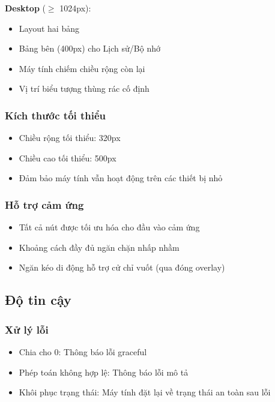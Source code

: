 \textbf{Desktop} ($\geq$ 1024px):
\begin{itemize}
    \item Layout hai bảng
    \item Bảng bên (400px) cho Lịch sử/Bộ nhớ
    \item Máy tính chiếm chiều rộng còn lại
    \item Vị trí biểu tượng thùng rác cố định
\end{itemize}

\subsubsection{Kích thước tối thiểu}
\begin{itemize}
    \item Chiều rộng tối thiểu: 320px
    \item Chiều cao tối thiểu: 500px
    \item Đảm bảo máy tính vẫn hoạt động trên các thiết bị nhỏ
\end{itemize}

\subsubsection{Hỗ trợ cảm ứng}
\begin{itemize}
    \item Tất cả nút được tối ưu hóa cho đầu vào cảm ứng
    \item Khoảng cách đầy đủ ngăn chặn nhấp nhầm
    \item Ngăn kéo di động hỗ trợ cử chỉ vuốt (qua đóng overlay)
\end{itemize}

\subsection{Độ tin cậy}

\subsubsection{Xử lý lỗi}
\begin{itemize}
    \item Chia cho 0: Thông báo lỗi graceful
    \item Phép toán không hợp lệ: Thông báo lỗi mô tả
    \item Khôi phục trạng thái: Máy tính đặt lại về trạng thái an toàn sau lỗi
\end{itemize}

